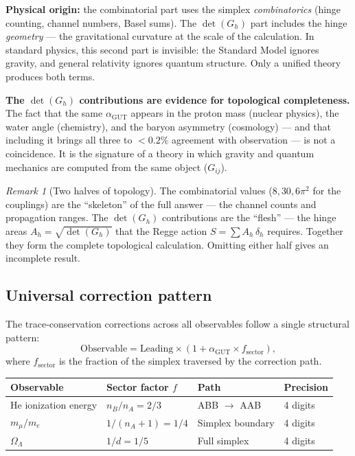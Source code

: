 \documentclass[12pt]{article}
\theoremstyle{remark}
\newtheorem{remark}[theorem]{Remark}
\theoremstyle{definition}
\begin{document}
\textbf{Physical origin:} the combinatorial part uses the simplex \emph{combinatorics} (hinge counting, channel numbers, Basel sums). The $\det(G_h)$ part includes the hinge \emph{geometry} --- the gravitational curvature at the scale of the calculation. In standard physics, this second part is invisible: the Standard Model ignores gravity, and general relativity ignores quantum structure. Only a unified theory produces both terms.

\textbf{The $\det(G_h)$ contributions are evidence for topological completeness.} The fact that the same $\alpha_\text{GUT}$ appears in the proton mass (nuclear physics), the water angle (chemistry), and the baryon asymmetry (cosmology) --- and that including it brings all three to $< 0.2\%$ agreement with observation --- is not a coincidence. It is the signature of a theory in which gravity and quantum mechanics are computed from the same object ($G_{ij}$).

\begin{remark}[Two halves of topology]
The combinatorial values ($8, 30, 6\pi^2$ for the couplings) are the ``skeleton'' of the full answer --- the channel counts and propagation ranges. The $\det(G_h)$ contributions are the ``flesh'' --- the hinge areas $A_h = \sqrt{\det(G_h)}$ that the Regge action $S = \sum A_h\,\delta_h$ requires. Together they form the complete topological calculation. Omitting either half gives an incomplete result.
\end{remark}

\subsection{Universal correction pattern}
\label{sec:universal_correction}

The trace-conservation corrections across all observables follow a single structural pattern:
\begin{equation}
\boxed{\text{Observable} = \text{Leading} \times \left(1 + \alpha_\mathrm{GUT} \times f_\mathrm{sector}\right),}
\end{equation}
where $f_\mathrm{sector}$ is the fraction of the simplex traversed by the correction path.

\begin{center}
\begin{tabular}{llll}
\toprule
Observable & Sector factor $f$ & Path & Precision \\
\midrule
He ionization energy & $n_B/n_A = 2/3$ & ABB $\to$ AAB & 4 digits \\
$m_\mu/m_e$ & $1/(n_A+1) = 1/4$ & Simplex boundary & 4 digits \\
$\Omega_\Lambda$ & $1/d = 1/5$ & Full simplex & 4 digits \\
\bottomrule
\end{tabular}
\end{center}
\end{document}

